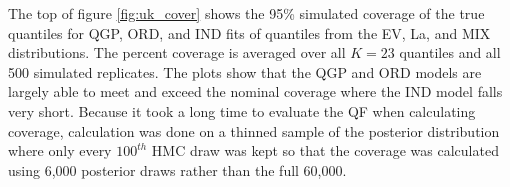 \documentclass[preprint,12pt,authoryear]{elsarticle}
\newcommand{\1}[1]{\mathds{1}\left[#1\right]}
\begin{document}





The top of figure \ref{fig:uk_cover} shows the 95\% simulated coverage of the 
true quantiles 
for QGP, ORD, and IND fits of quantiles from the EV, La, and MIX distributions. 
The percent coverage is 
averaged over all $K = 23$ quantiles and all 500 simulated replicates.  
The plots show that the QGP and ORD models are largely able to meet and exceed 
the nominal coverage where the IND model falls very short. Because it took a 
long time to evaluate the QF when calculating coverage, calculation was done on 
a thinned sample of the posterior distribution where only every $100^{th}$ HMC 
draw was kept so that the coverage was calculated using 6,000 posterior draws 
rather than the full 60,000.
\end{document}
